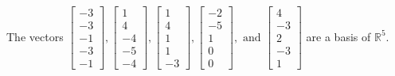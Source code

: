 \begin{exercise}
\begin{exerciseStatement}
  \end{exerciseStatement}
  \begin{exerciseAnswer}
   The vectors \(\left[\begin{array}{r}
-3 \\
-3 \\
-1 \\
-3 \\
-1
\end{array}\right] , \left[\begin{array}{r}
1 \\
4 \\
-4 \\
-5 \\
-4
\end{array}\right] , \left[\begin{array}{r}
1 \\
4 \\
1 \\
1 \\
-3
\end{array}\right] , \left[\begin{array}{r}
-2 \\
-5 \\
1 \\
0 \\
0
\end{array}\right] , \text{ and } \left[\begin{array}{r}
4 \\
-3 \\
2 \\
-3 \\
1
\end{array}\right]\) 
  	 are  a basis of \(\mathbb{R}^5\).
  


  \end{exerciseAnswer}
\end{exercise}